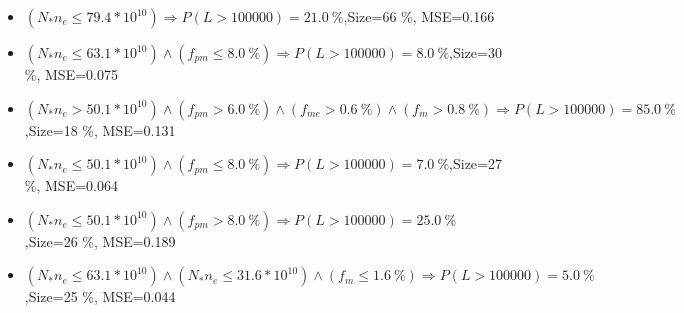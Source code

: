 \documentclass[numbered]{CSL}
\begin{document}
\begin{itemize}
\item $(N_* n_e \leq 79.4 * 10^{10}) \Rightarrow P(L > 100 000) = 21.0~\%$,\hfill Size=66 \%, MSE=0.166
\item $(N_* n_e \leq 63.1 * 10^{10}) \land (f_{pm} \leq 8.0~\%) \Rightarrow P(L > 100 000) = 8.0~\%$,\hfill Size=30 \%, MSE=0.075
\item $(N_* n_e > 50.1 * 10^{10}) \land (f_{pm} > 6.0~\%) \land (f_{me} > 0.6~\%) \land (f_m > 0.8~\%) \Rightarrow P(L > 100 000) = 85.0~\%$,\hfill Size=18 \%, MSE=0.131
\item $(N_* n_e \leq 50.1 * 10^{10}) \land (f_{pm} \leq 8.0~\%) \Rightarrow P(L > 100 000) = 7.0~\%$,\hfill Size=27 \%, MSE=0.064
\item $(N_* n_e \leq 50.1 * 10^{10}) \land (f_{pm} > 8.0~\%) \Rightarrow P(L > 100 000) = 25.0~\%$,\hfill Size=26 \%, MSE=0.189
\item $(N_* n_e \leq 63.1 * 10^{10}) \land (N_* n_e \leq 31.6 * 10^{10}) \land (f_m \leq 1.6~\%) \Rightarrow P(L > 100 000) = 5.0~\%$,\hfill Size=25 \%, MSE=0.044
\end{itemize}
\end{document}
